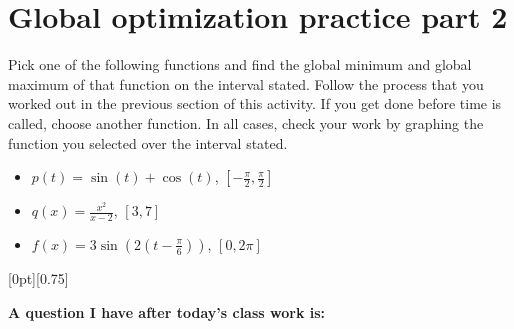 \documentclass[11pt]{article}
\newcommand{\cuthere}{%
\noindent
\raisebox{-2.8pt}[0pt][0.75\baselineskip]{\small\ding{34}}
\unskip{\tiny\dotfill}
}
\begin{document}
\section{Global optimization practice part 2}

Pick one of the following functions and find the global minimum and global maximum of that function on the interval stated. Follow the process that you worked out in the previous section of this activity. If you get done before time is called, choose another function. In all cases, check your work by graphing the function you selected over the interval stated. 

\begin{itemize}
	\item $p(t) = \sin(t) + \cos(t)$, $\left[-\frac{\pi}{2}, \frac{\pi}{2}\right]$
	\item $q(x) = \frac{x^2}{x-2}$, $[3,7]$
	\item $f(x) = 3\sin\left(2 \left(t - \frac{\pi}{6}\right)\right)$, $[0, 2\pi]$
\end{itemize}


\vfill 

\cuthere

\noindent
\textbf{A question I have after today's class work is:}

\vspace{1in}
\end{document}

